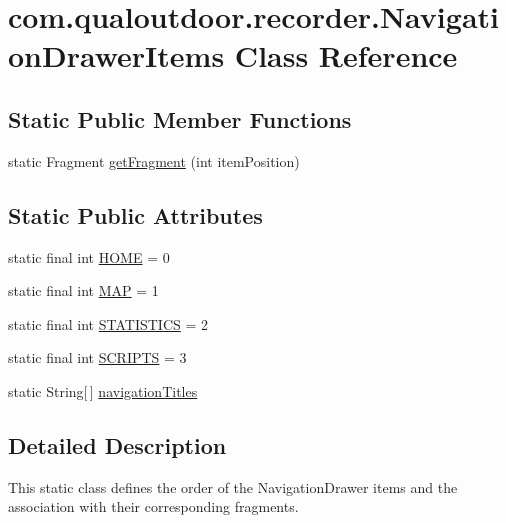 \hypertarget{classcom_1_1qualoutdoor_1_1recorder_1_1NavigationDrawerItems}{\section{com.\-qualoutdoor.\-recorder.\-Navigation\-Drawer\-Items Class Reference}
\label{classcom_1_1qualoutdoor_1_1recorder_1_1NavigationDrawerItems}
}
\subsection*{Static Public Member Functions}
\begin{DoxyCompactItemize}
\item 
static Fragment \hyperlink{classcom_1_1qualoutdoor_1_1recorder_1_1NavigationDrawerItems_a85f48aa8d7bf2b19c29580a7a9275c56}{get\-Fragment} (int item\-Position)
\end{DoxyCompactItemize}
\subsection*{Static Public Attributes}
\begin{DoxyCompactItemize}
\item 
static final int \hyperlink{classcom_1_1qualoutdoor_1_1recorder_1_1NavigationDrawerItems_afadd3e94707fd15b43fe32e89256f1f1}{H\-O\-M\-E} = 0
\item 
static final int \hyperlink{classcom_1_1qualoutdoor_1_1recorder_1_1NavigationDrawerItems_ad8e672418abc393ea6a4df48e97352ef}{M\-A\-P} = 1
\item 
static final int \hyperlink{classcom_1_1qualoutdoor_1_1recorder_1_1NavigationDrawerItems_aac54515cf8ace5b4359c3e1f417fa753}{S\-T\-A\-T\-I\-S\-T\-I\-C\-S} = 2
\item 
static final int \hyperlink{classcom_1_1qualoutdoor_1_1recorder_1_1NavigationDrawerItems_a3a0cf69b1f37ef4ef62788a5c9f768fd}{S\-C\-R\-I\-P\-T\-S} = 3
\item 
static String\mbox{[}$\,$\mbox{]} \hyperlink{classcom_1_1qualoutdoor_1_1recorder_1_1NavigationDrawerItems_a5d17ce61823c857dc351d1ff0a44b264}{navigation\-Titles}
\end{DoxyCompactItemize}


\subsection{Detailed Description}
This static class defines the order of the Navigation\-Drawer items and the association with their corresponding fragments.

